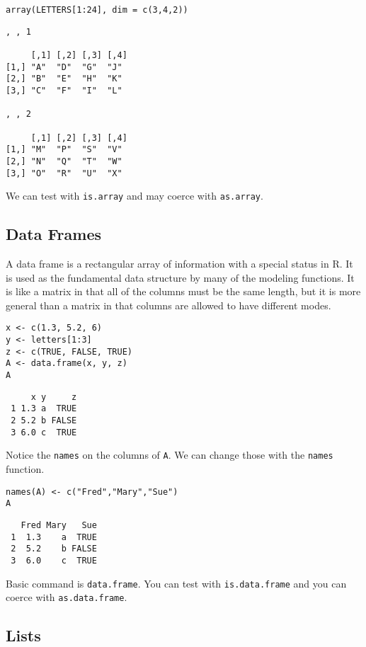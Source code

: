 \documentclass[captions=tableheading]{scrbook}
\begin{document}
\begin{verbatim}
array(LETTERS[1:24], dim = c(3,4,2))
\end{verbatim}


\begin{verbatim}
, , 1

     [,1] [,2] [,3] [,4]
[1,] "A"  "D"  "G"  "J" 
[2,] "B"  "E"  "H"  "K" 
[3,] "C"  "F"  "I"  "L" 

, , 2

     [,1] [,2] [,3] [,4]
[1,] "M"  "P"  "S"  "V" 
[2,] "N"  "Q"  "T"  "W" 
[3,] "O"  "R"  "U"  "X"
\end{verbatim}

We can test with \texttt{is.array} and may coerce with \texttt{as.array}.
\subsection{Data Frames}
\label{sec-5-1-3}


A data frame is a rectangular array of information with a special status in \textsf{R}. It is used as the fundamental data structure by many of the modeling functions. It is like a matrix in that all of the columns must be the same length, but it is more general than a matrix in that columns are allowed to have different modes.


\begin{verbatim}
x <- c(1.3, 5.2, 6)
y <- letters[1:3]
z <- c(TRUE, FALSE, TRUE)
A <- data.frame(x, y, z)
A
\end{verbatim}

\begin{verbatim}
     x y     z
 1 1.3 a  TRUE
 2 5.2 b FALSE
 3 6.0 c  TRUE
\end{verbatim}

Notice the \texttt{names} on the columns of \texttt{A}. We can change those with the \texttt{names} function.


\begin{verbatim}
names(A) <- c("Fred","Mary","Sue")
A
\end{verbatim}

\begin{verbatim}
   Fred Mary   Sue
 1  1.3    a  TRUE
 2  5.2    b FALSE
 3  6.0    c  TRUE
\end{verbatim}

Basic command is \texttt{data.frame}. You can test with \texttt{is.data.frame} and you can coerce with \texttt{as.data.frame}.
\subsection{Lists}
\label{sec-5-1-4}
\end{document}

